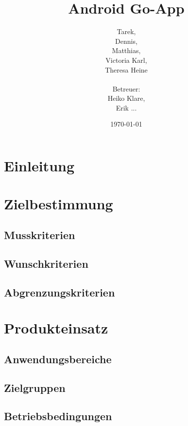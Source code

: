 \documentclass[parskip=full]{scrartcl}
\begin{document}
\title{Android Go-App}
\author{Tarek, \\Dennis, \\Matthias, \\Victoria Karl, \\Theresa Heine\\
	\\Betreuer: \\Heiko Klare, \\ Erik ...\\}	
\date{\today}
\maketitle
\newpage
\tableofcontents
\newpage

\section{Einleitung}

\section{Zielbestimmung}
\subsection{Musskriterien}

\subsection{Wunschkriterien}
\subsection{Abgrenzungskriterien}

\section{Produkteinsatz}
\subsection{Anwendungsbereiche}
\subsection{Zielgruppen}
\subsection{Betriebsbedingungen}
\end{document}

